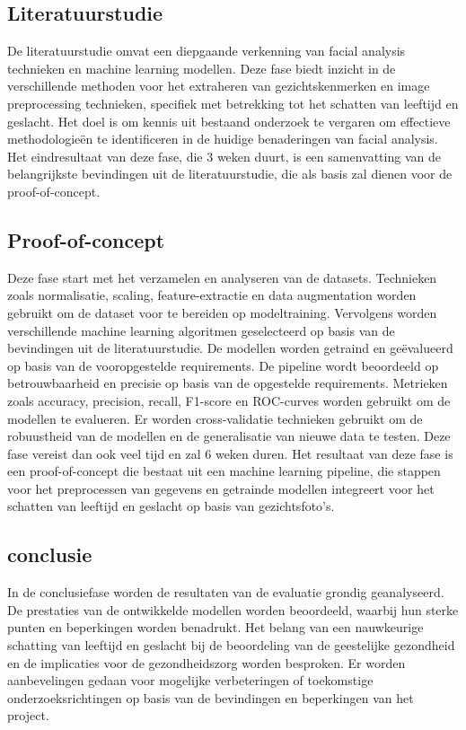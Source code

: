 \subsection{Literatuurstudie}
\label{sub:literatuurstudie}
De literatuurstudie omvat een diepgaande verkenning van facial analysis technieken en machine learning modellen. 
Deze fase biedt inzicht in de verschillende methoden voor het extraheren van gezichtskenmerken en image preprocessing technieken, specifiek met betrekking tot het schatten van leeftijd en geslacht.
Het doel is om kennis uit bestaand onderzoek te vergaren om effectieve methodologieën te identificeren in de huidige benaderingen van facial analysis. 
Het eindresultaat van deze fase, die 3 weken duurt, is een samenvatting van de belangrijkste bevindingen uit de literatuurstudie, die als basis zal dienen voor de proof-of-concept.
\subsection{Proof-of-concept}
\label{sub:proof-of-concept}
Deze fase start met het verzamelen en analyseren van de datasets. Technieken zoals normalisatie, scaling, feature-extractie en data augmentation worden gebruikt om de dataset voor te bereiden op modeltraining.
Vervolgens worden verschillende machine learning algoritmen geselecteerd op basis van de bevindingen uit de literatuurstudie. De modellen worden getraind en geëvalueerd op basis van de vooropgestelde requirements. 
De pipeline wordt beoordeeld op betrouwbaarheid en precisie op basis van de opgestelde requirements. Metrieken zoals accuracy, precision, recall, F1-score en ROC-curves worden gebruikt om de modellen te evalueren.
Er worden cross-validatie technieken gebruikt om de robuustheid van de modellen en de generalisatie van nieuwe data te testen. 
Deze fase vereist dan ook veel tijd en zal 6 weken duren. Het resultaat van deze fase is een proof-of-concept die bestaat uit een machine learning pipeline, die stappen voor het preprocessen van gegevens en getrainde modellen integreert voor het schatten van leeftijd en geslacht op basis van gezichtsfoto's.

\subsection{conclusie}
\label{sub:conclusie}
In de conclusiefase worden de resultaten van de evaluatie grondig geanalyseerd. De prestaties van de ontwikkelde modellen worden beoordeeld, waarbij hun sterke punten en beperkingen worden benadrukt. Het belang van een nauwkeurige schatting van leeftijd en geslacht bij de beoordeling van de geestelijke gezondheid en de implicaties voor de gezondheidszorg worden besproken. Er worden aanbevelingen gedaan voor mogelijke verbeteringen of toekomstige onderzoeksrichtingen op basis van de bevindingen en beperkingen van het project.
